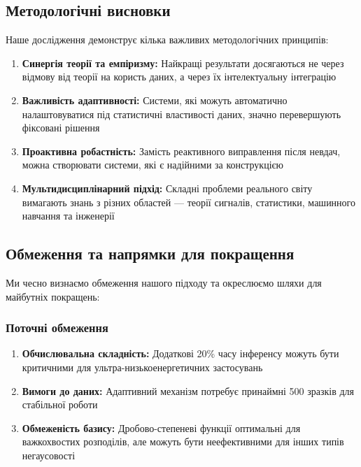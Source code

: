 \documentclass[12pt,a4paper]{article}
\begin{document}
\subsection{Методологічні висновки}

Наше дослідження демонструє кілька важливих методологічних принципів:

\begin{enumerate}
	\item \textbf{Синергія теорії та емпіризму:} Найкращі результати досягаються не через відмову від теорії на користь даних, а через їх інтелектуальну інтеграцію
	
	\item \textbf{Важливість адаптивності:} Системи, які можуть автоматично налаштовуватися під статистичні властивості даних, значно перевершують фіксовані рішення
	
	\item \textbf{Проактивна робастність:} Замість реактивного виправлення після невдач, можна створювати системи, які є надійними за конструкцією
	
	\item \textbf{Мультидисциплінарний підхід:} Складні проблеми реального світу вимагають знань з різних областей --- теорії сигналів, статистики, машинного навчання та інженерії
\end{enumerate}

\subsection{Обмеження та напрямки для покращення}

Ми чесно визнаємо обмеження нашого підходу та окреслюємо шляхи для майбутніх покращень:

\subsubsection{Поточні обмеження}

\begin{enumerate}
	\item \textbf{Обчислювальна складність:} Додаткові 20\% часу інференсу можуть бути критичними для ультра-низькоенергетичних застосувань
	
	\item \textbf{Вимоги до даних:} Адаптивний механізм потребує принаймні 500 зразків для стабільної роботи
	
	\item \textbf{Обмеженість базису:} Дробово-степеневі функції оптимальні для важкохвостих розподілів, але можуть бути неефективними для інших типів негаусовості
\end{enumerate}
\end{document}

